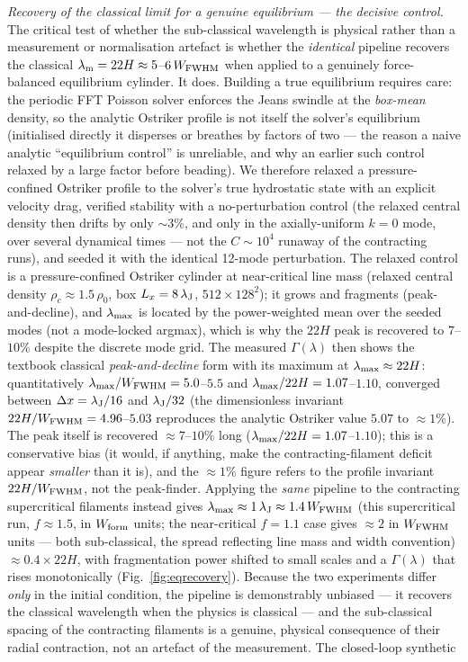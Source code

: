 \documentclass[usenatbib,twoside,twocolumn]{mnras}
\begin{document}
\emph{Recovery of the classical limit for a genuine equilibrium --- the decisive control.} The critical test of whether the sub-classical wavelength is physical rather than a measurement or normalisation artefact is whether the \emph{identical} pipeline recovers the classical $\lambda_{\rm m}=22H\approx5$--$6\,W_{\rm FWHM}$ when applied to a genuinely force-balanced equilibrium cylinder. It does. Building a true equilibrium requires care: the periodic FFT Poisson solver enforces the Jeans swindle at the \emph{box-mean} density, so the analytic Ostriker profile is not itself the solver's equilibrium (initialised directly it disperses or breathes by factors of two --- the reason a naive analytic ``equilibrium control'' is unreliable, and why an earlier such control relaxed by a large factor before beading). We therefore relaxed a pressure-confined Ostriker profile to the solver's true hydrostatic state with an explicit velocity drag, verified stability with a no-perturbation control (the relaxed central density then drifts by only $\sim3\%$, and only in the axially-uniform $k=0$ mode, over several dynamical times --- not the $C\sim10^{4}$ runaway of the contracting runs), and seeded it with the identical 12-mode perturbation. The relaxed control is a pressure-confined Ostriker cylinder at near-critical line mass (relaxed central density $\rho_c\approx1.5\,\rho_0$, box $L_x=8\,\lambda_{\rm J}$, $512\times128^2$); it grows and fragments (peak-and-decline), and $\lambda_{\rm max}$ is located by the power-weighted mean over the seeded modes (not a mode-locked argmax), which is why the $22H$ peak is recovered to $7$--$10\%$ despite the discrete mode grid. The measured $\Gamma(\lambda)$ then shows the textbook classical \emph{peak-and-decline} form with its maximum at $\lambda_{\rm max}\approx22H$: quantitatively $\lambda_{\rm max}/W_{\rm FWHM}=5.0$--$5.5$ and $\lambda_{\rm max}/22H=1.07$--$1.10$, converged between $\Delta x=\lambda_{\rm J}/16$ and $\lambda_{\rm J}/32$ (the dimensionless invariant $22H/W_{\rm FWHM}=4.96$--$5.03$ reproduces the analytic Ostriker value $5.07$ to $\approx1\%$). The peak itself is recovered $\approx7$--$10\%$ long ($\lambda_{\rm max}/22H=1.07$--$1.10$); this is a conservative bias (it would, if anything, make the contracting-filament deficit appear \emph{smaller} than it is), and the $\approx1\%$ figure refers to the profile invariant $22H/W_{\rm FWHM}$, not the peak-finder. Applying the \emph{same} pipeline to the contracting supercritical filaments instead gives $\lambda_{\rm max}\approx1\,\lambda_{\rm J}\approx1.4\,W_{\rm FWHM}$ (this supercritical run, $f\approx1.5$, in $W_{\rm form}$ units; the near-critical $f=1.1$ case gives $\approx2$ in $W_{\rm FWHM}$ units --- both sub-classical, the spread reflecting line mass and width convention) $\approx0.4\times22H$, with fragmentation power shifted to small scales and a $\Gamma(\lambda)$ that rises monotonically (Fig.~\ref{fig:eqrecovery}). Because the two experiments differ \emph{only} in the initial condition, the pipeline is demonstrably unbiased --- it recovers the classical wavelength when the physics is classical --- and the sub-classical spacing of the contracting filaments is a genuine, physical consequence of their radial contraction, not an artefact of the measurement. The closed-loop synthetic 
\end{document}
